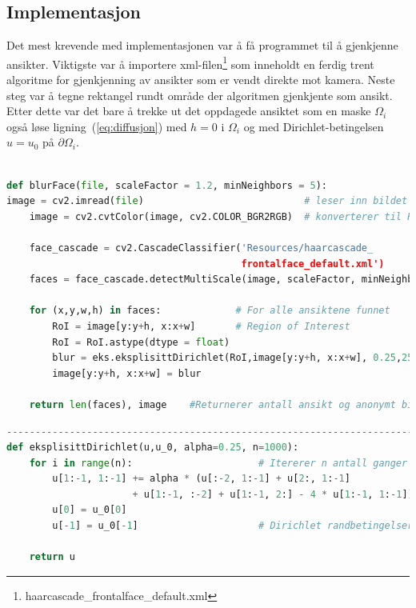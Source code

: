 \subsection{Implementasjon}
Det mest krevende med implementasjonen var å få programmet til å gjenkjenne ansikter. Viktigste var å importere xml-filen\footnote{haarcascade\_frontalface\_default.xml\cite{xml:haar}} som inneholdt en ferdig trent algoritme for gjenkjenning av ansikter som er vendt direkte mot kamera. Neste steg var å tegne rektangel rundt område der algoritmen gjenkjente som ansikt. Etter dette var det bare å trekke ut det oppdagede ansiktet som en maske $\Omega_i$ også løse ligning~(\ref{eq:diffusjon}) med $h=0$ i $\Omega_i$ og med Dirichlet-betingelsen $u = u_0$ på $\partial\Omega_i$.
\begin{lstlisting}[language=Python]

def blurFace(file, scaleFactor = 1.2, minNeighbors = 5):
image = cv2.imread(file)                            # leser inn bildet BGR
    image = cv2.cvtColor(image, cv2.COLOR_BGR2RGB)  # konverterer til RGB
    
    face_cascade = cv2.CascadeClassifier('Resources/haarcascade_
                                         frontalface_default.xml') 
    faces = face_cascade.detectMultiScale(image, scaleFactor, minNeighbors)
                                        
    for (x,y,w,h) in faces:             # For alle ansiktene funnet
        RoI = image[y:y+h, x:x+w]       # Region of Interest
        RoI = RoI.astype(dtype = float)
        blur = eks.eksplisittDirichlet(RoI,image[y:y+h, x:x+w], 0.25,250)               
        image[y:y+h, x:x+w] = blur
        
    return len(faces), image    #Returnerer antall ansikt og anonymt bilde
\end{lstlisting}

\begin{lstlisting}[language=Python]
-------------------------------------------------------------------------
def eksplisittDirichlet(u,u_0, alpha=0.25, n=1000):
    for i in range(n):                      # Itererer n antall ganger
        u[1:-1, 1:-1] += alpha * (u[:-2, 1:-1] + u[2:, 1:-1]
                      + u[1:-1, :-2] + u[1:-1, 2:] - 4 * u[1:-1, 1:-1])
        u[0] = u_0[0]  
        u[-1] = u_0[-1]                     # Dirichlet randbetingelser
        
    return u
\end{lstlisting}


